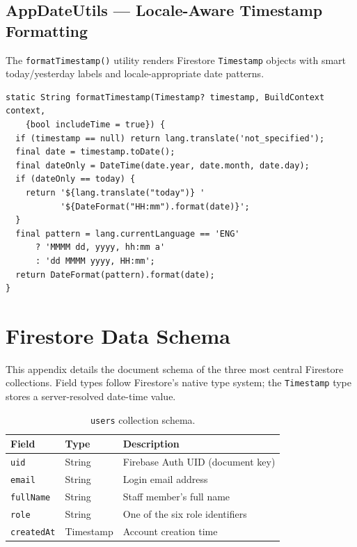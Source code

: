 \documentclass[12pt,a4paper,oneside]{report}
\newcommand{\source}[1]{\par\vspace{2pt}{\small\itshape Source: #1}\par}
\begin{document}
\section{AppDateUtils --- Locale-Aware Timestamp Formatting}

The \texttt{formatTimestamp()} utility renders Firestore \texttt{Timestamp}
objects with smart today/yesterday labels and locale-appropriate date patterns.

\begin{lstlisting}[caption={Locale-aware timestamp formatting in
  \texttt{date\_utils.dart}.},label={lst:dateutils}]
static String formatTimestamp(Timestamp? timestamp, BuildContext context,
    {bool includeTime = true}) {
  if (timestamp == null) return lang.translate('not_specified');
  final date = timestamp.toDate();
  final dateOnly = DateTime(date.year, date.month, date.day);
  if (dateOnly == today) {
    return '${lang.translate("today")} '
           '${DateFormat("HH:mm").format(date)}';
  }
  final pattern = lang.currentLanguage == 'ENG'
      ? 'MMMM dd, yyyy, hh:mm a'
      : 'dd MMMM yyyy, HH:mm';
  return DateFormat(pattern).format(date);
}
\end{lstlisting}

\chapter{Firestore Data Schema}

This appendix details the document schema of the three most central Firestore
collections. Field types follow Firestore's native type system; the
\texttt{Timestamp} type stores a server-resolved date-time value.

\begin{table}[htbp]
  \centering
  \caption{\texttt{users} collection schema.}
  \label{tab:users}
  \begin{tabularx}{\textwidth}{l l X}
    \toprule
    \textbf{Field} & \textbf{Type} & \textbf{Description}\\
    \midrule
    \texttt{uid} & String & Firebase Auth UID (document key)\\
    \texttt{email} & String & Login email address\\
    \texttt{fullName} & String & Staff member's full name\\
    \texttt{role} & String & One of the six role identifiers\\
    \texttt{createdAt} & Timestamp & Account creation time\\
    \bottomrule
  \end{tabularx}
  \source{author.}
\end{table}
\end{document}
